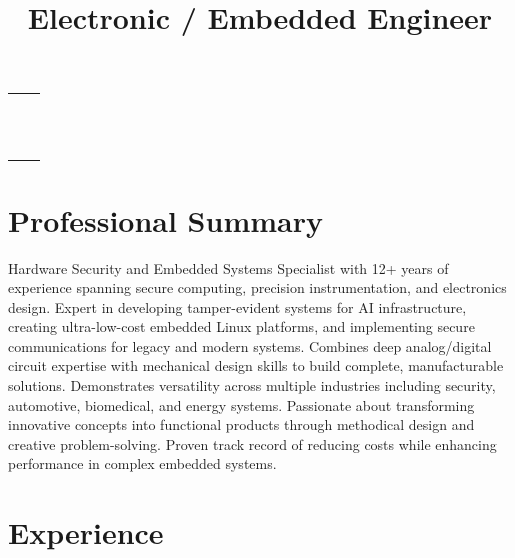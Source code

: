 \documentclass[10pt,letterpaper,roman]{moderncv}        %
\title{Electronic / Embedded Engineer}
\makeatletter
\renewcommand*{\makecvtitle}{%
  \vspace*{-15pt}
  \begin{tabularx}{\textwidth}{@{}X r@{}}
    \begin{minipage}{0.5\textwidth}
      {\Huge\textcolor{burgundy}{\textbf{\@firstname~\@lastname}}}\\[0.4em]
      {\large\color{gray}\textsc{\@title}}
    \end{minipage} &
    \begin{minipage}{0.48\textwidth}
      \raggedleft
      \ifthenelse{\isundefined{\@addressstreet}}{}{\addresssymbol\@addressstreet\\}%
      \ifthenelse{\isundefined{\@addresscity}}{}{\@addresscity\\}%
      \mobilesymbol+1~(215)~690~1415\\
      \ifthenelse{\isundefined{\@email}}{}{\emailsymbol\emaillink{\@email}\\}%
      \ifthenelse{\isundefined{\@homepage}}{}{\homepagesymbol\httplink{\@homepage}\\}%
      \ifthenelse{\isundefined{\@linkedinsocialsymbol}}{}{\@linkedinsocialsymbol\httplink{linkedin.com/in/\@linkedinsocial}\\}%
      \ifthenelse{\isundefined{\@twittersocialsymbol}}{}{\@twittersocialsymbol\httplink{twitter.com/\@twittersocial}\\}%
      \ifthenelse{\isundefined{\@githubsocialsymbol}}{}{\@githubsocialsymbol\httplink{github.com/\@githubsocial}\\}%
      \ifthenelse{\isundefined{\@signalsocialsymbol}}{}{\@signalsocialsymbol\@signalsocial\\}%
    \end{minipage}
  \end{tabularx}
  \par\vspace{2.5em}
}
\makeatother
\begin{document}
\makecvtitle



\section{Professional Summary}
Hardware Security and Embedded Systems Specialist with 12+ years of experience spanning secure computing, precision instrumentation, and electronics design. Expert in developing tamper-evident systems for AI infrastructure, creating ultra-low-cost embedded Linux platforms, and implementing secure communications for legacy and modern systems. Combines deep analog/digital circuit expertise with mechanical design skills to build complete, manufacturable solutions. Demonstrates versatility across multiple industries including security, automotive, biomedical, and energy systems. Passionate about transforming innovative concepts into functional products through methodical design and creative problem-solving. Proven track record of reducing costs while enhancing performance in complex embedded systems.\newline

\section{Experience}
\end{document}
